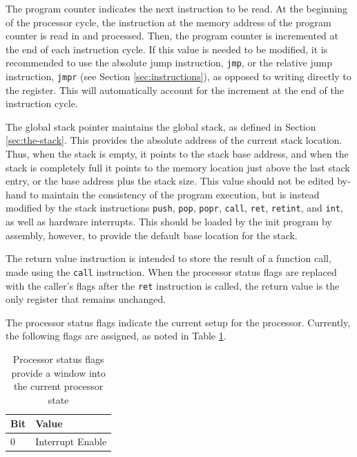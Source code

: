 \documentclass{article}
\begin{document}
The program counter indicates the next instruction to be read. At the beginning of the processor cycle, the instruction at the memory address of the program counter is read in and processed. Then, the program counter is incremented at the end of each instruction cycle. If this value is needed to be modified, it is recommended to use the absolute \alert{jump instruction}, \texttt{jmp}, or the \alert{relative jump instruction}, \texttt{jmpr} (see Section \ref{sec:instructions}), as opposed to writing directly to the register. This will automatically account for the increment at the end of the instruction cycle.

The global stack pointer maintains the global stack, as defined in Section \ref{sec:the-stack}. This provides the absolute address of the current stack location. Thus, when the stack is empty, it points to the stack base address, and when the stack is completely full it points to the memory location just above the last stack entry, or the base address plus the stack size. This value should not be edited by-hand to maintain the consistency of the program execution, but is instead modified by the \alert{stack instructions} \texttt{push}, \texttt{pop}, \texttt{popr}, \texttt{call}, \texttt{ret}, \texttt{retint}, and \texttt{int}, as well as hardware interrupts. This should be loaded by the init program by assembly, however, to provide the default base location for the stack.

The return value instruction is intended to store the result of a function call, made using the \texttt{call} instruction. When the processor status flags are replaced with the caller's flags after the \texttt{ret} \alert{instruction} is called, the return value is the only register that remains unchanged.

The processor status flags indicate the current setup for the processor. Currently, the following flags are assigned, as noted in Table \ref{table:processor-flags}.

\begin{table}[h!]
    \centering
    \begin{tabular}{l|l}
        \hline
        Bit & Value \\
        \hline
        0 & Interrupt Enable \\
        \hline
    \end{tabular}
    \caption{Processor status flags provide a window into the current processor state}
    \label{table:processor-flags}
\end{table}
\end{document}
